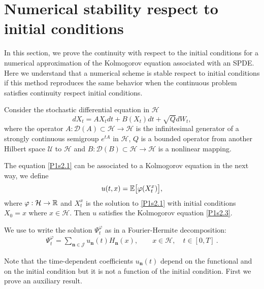\documentclass[review,onefignum,onetabnum]{siamart190516}
\begin{document}
\section{Numerical stability respect to  initial conditions}
\label{sec:ContinuityRespectToInitialConditions}

    In this section, we prove the continuity with respect to the initial
conditions for a numerical approximation of the Kolmogorov equation associated 
with an SPDE. Here we understand that a  numerical scheme is stable respect to 
initial conditions if this method reproduces the same behavior when the 
continuous problem satisfies continuity respect initial conditions.

Consider the stochastic differential equation in $\mathcal{H}$
\begin{equation}
\label{P1s2.1}
 dX_t=AX_tdt+B(X_t)dt+\sqrt{Q}dW_t,
\end{equation}
where the operator $A:\mathcal{D}(A)\subset \mathcal{H}\rightarrow
\mathcal{H}$ is the infinitesimal generator of a strongly
continuous semigroup $e^{tA}$ in $\mathcal{H}$, $Q$ is a bounded operator from
another Hilbert space $\mathcal{U}$ to $\mathcal{H}$
and $B:\mathcal{D}(B)\subset \mathcal{H}\rightarrow \mathcal{H}$ is a
nonlinear mapping.

The equation \eqref{P1s2.1} can be associated to a Kolmogorov equation in the
next way, we define
\begin{equation}
\label{P1s2.2}
u(t,x)=\E\big[\varphi(X_t^x)\big],
\end{equation}
where $\varphi:\mathcal{H}\rightarrow {\mathbb R}$ and $X_t^x$ is the solution to
\eqref{P1s2.1} with initial conditions $X_0=x$ where
$x\in\mathcal{H}$. Then $u$ satisfies the Kolmogorov equation \eqref{P1s2.3}.


We use  to write the solution $\Psi_t^\varphi$ as in a
Fourier-Hermite decomposition:
\begin{align}
    \Psi_t ^ \varphi=
        \sum_{\bm{n}\in \mathcal{J}}
        u_{\bm{n}}(t) H_{\bm{n}}(x),
        \qquad
        x \in \mathcal{H},
        \quad t \in [0,T] \ .
        \label{num-approx}
\end{align}

Note that the time-dependent coefficients $ u_{\bm{n}}(t)$ depend on the
functional and on the initial condition but it is not a function of
the initial condition. First we  prove an auxiliary result.
\end{document}
